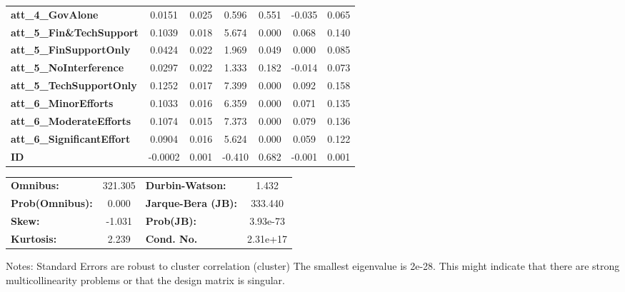 \begin{center}
\begin{tabular}{lcccccc}
\textbf{att\_4\_GovAlone}                   &       0.0151  &        0.025     &     0.596  &         0.551        &       -0.035    &        0.065     \\
\textbf{att\_5\_Fin\&TechSupport}           &       0.1039  &        0.018     &     5.674  &         0.000        &        0.068    &        0.140     \\
\textbf{att\_5\_FinSupportOnly}             &       0.0424  &        0.022     &     1.969  &         0.049        &        0.000    &        0.085     \\
\textbf{att\_5\_NoInterference}             &       0.0297  &        0.022     &     1.333  &         0.182        &       -0.014    &        0.073     \\
\textbf{att\_5\_TechSupportOnly}            &       0.1252  &        0.017     &     7.399  &         0.000        &        0.092    &        0.158     \\
\textbf{att\_6\_MinorEfforts}               &       0.1033  &        0.016     &     6.359  &         0.000        &        0.071    &        0.135     \\
\textbf{att\_6\_ModerateEfforts}            &       0.1074  &        0.015     &     7.373  &         0.000        &        0.079    &        0.136     \\
\textbf{att\_6\_SignificantEffort}          &       0.0904  &        0.016     &     5.624  &         0.000        &        0.059    &        0.122     \\
\textbf{ID}                                 &      -0.0002  &        0.001     &    -0.410  &         0.682        &       -0.001    &        0.001     \\
\bottomrule
\end{tabular}
\begin{tabular}{lclc}
\textbf{Omnibus:}       & 321.305 & \textbf{  Durbin-Watson:     } &    1.432  \\
\textbf{Prob(Omnibus):} &   0.000 & \textbf{  Jarque-Bera (JB):  } &  333.440  \\
\textbf{Skew:}          &  -1.031 & \textbf{  Prob(JB):          } & 3.93e-73  \\
\textbf{Kurtosis:}      &   2.239 & \textbf{  Cond. No.          } & 2.31e+17  \\
\bottomrule
\end{tabular}
\end{center}

Notes: \newline
 [1] Standard Errors are robust to cluster correlation (cluster) \newline
 [2] The smallest eigenvalue is  2e-28. This might indicate that there are \newline
 strong multicollinearity problems or that the design matrix is singular.